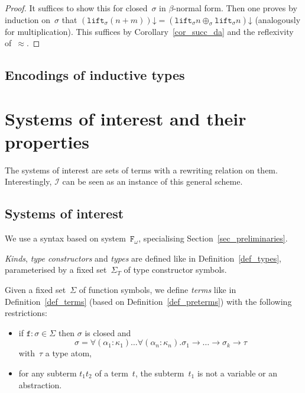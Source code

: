 \documentclass[runningheads,a4paper]{llncs}
\newcommand{\Fomega}{\mathtt{F}_\omega}
\newcommand{\Iterms}{\mathcal{I}}
\newcommand{\arrtype}{\rightarrow}
\newcommand{\lift}{\mathtt{lift}}
\newcommand{\da}{\mathord{\downarrow}}
\begin{document}
\begin{proof}
  It suffices to show this for closed~$\sigma$ in $\beta$-normal
  form. Then one proves by induction on~$\sigma$ that
  $(\lift_\sigma(n+m))\da = (\lift_\sigma n \oplus_\sigma \lift_\sigma
  n)\da$ (analogously for multiplication). This suffices by
  Corollary~\ref{cor_succ_da} and the reflexivity of~$\approx$.
\end{proof}

\subsection{Encodings of inductive types}\label{sec_encodings}


\section{Systems of interest and their properties}\label{sec:systems}

The systems of interest are sets of terms with a rewriting relation on
them. Interestingly, $\Iterms$ can be seen as an instance of this
general scheme.

\subsection{Systems of interest}

We use a syntax based on system~$\Fomega$, specialising
Section~\ref{sec_preliminaries}.

\begin{definition}\normalfont
  \emph{Kinds}, \emph{type constructors} and \emph{types} are defined
  like in Definition~\ref{def_types}, parameterised by a fixed
  set~$\Sigma_T$ of type constructor symbols.

  Given a fixed set~$\Sigma$ of function symbols, we define
  \emph{terms} like in Definition~\ref{def_terms} (based on
  Definition~\ref{def_preterms}) with the following restrictions:
  \begin{itemize}
  \item if $\mathtt{f} : \sigma \in \Sigma$ then $\sigma$ is closed and
    \[
    \sigma = \forall (\alpha_1 : \kappa_1) \ldots \forall (\alpha_n : \kappa_n)
    . \sigma_1 \arrtype \ldots \arrtype \sigma_k \arrtype \tau
    \]
    with~$\tau$ a type atom,
  \item for any subterm $t_1 t_2$ of a term~$t$, the subterm~$t_1$ is
    not a variable or an abstraction.
  \end{itemize}
\end{definition}
\end{document}
